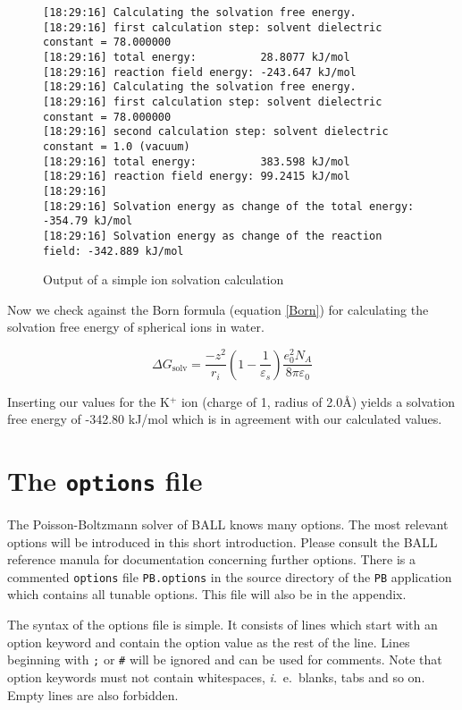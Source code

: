 \documentclass[12pt,twoside,a4paper]{article}
\begin{document}
\begin{figure}[H]
\scriptsize
\begin{verbatim}
[18:29:16] Calculating the solvation free energy.
[18:29:16] first calculation step: solvent dielectric constant = 78.000000
[18:29:16] total energy:          28.8077 kJ/mol
[18:29:16] reaction field energy: -243.647 kJ/mol
[18:29:16] Calculating the solvation free energy.
[18:29:16] first calculation step: solvent dielectric constant = 78.000000
[18:29:16] second calculation step: solvent dielectric constant = 1.0 (vacuum)
[18:29:16] total energy:          383.598 kJ/mol
[18:29:16] reaction field energy: 99.2415 kJ/mol
[18:29:16] 
[18:29:16] Solvation energy as change of the total energy:   -354.79 kJ/mol
[18:29:16] Solvation energy as change of the reaction field: -342.889 kJ/mol
\end{verbatim}
\normalsize
\caption{Output of a simple ion solvation calculation}
\label{outputK}
\end{figure}

Now we check against the Born\cite{Born1920} formula (equation \ref{Born}) for
calculating the solvation free energy of spherical ions in water.

\begin{equation}
\Delta G_{\mathrm{solv}} = \frac{-z^2}{r_i} \left(1 - \frac{1}{\varepsilon_s}\right) \frac{e_0^2 N_A}{8 \pi \varepsilon_0}
\label{Born}
\end{equation}

Inserting our values for the K$^+$ ion (charge of 1, radius of 2.0\AA)
yields a solvation free energy of -342.80 kJ/mol which is in agreement with
our calculated values.

\section{The {\tt options} file}

The Poisson-Boltzmann solver of BALL knows many options. The most relevant
options will be introduced in this short introduction. Please consult the
BALL reference manula for documentation concerning further options. There
is a commented {\tt options} file {\tt PB.options} in the source directory
of the {\tt PB} application which contains all tunable options. This file
will also be in the appendix. 

The syntax of the options file is simple. It consists of lines which start
with an option keyword and contain the option value as the rest of the
line. Lines beginning with \verb+;+ or \verb+#+ will be ignored and can be
used for comments. Note that option keywords must not contain whitespaces,
{\textit i.~e.~}blanks, tabs and so on. Empty lines are also forbidden.
\end{document}
